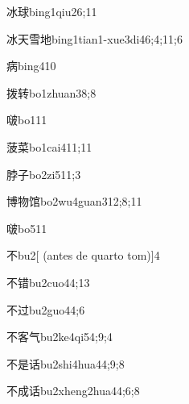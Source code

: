 \begin{verbete}{冰球}{bing1qiu2}{6;11}
\end{verbete}
\begin{verbete}{冰天雪地}{bing1tian1-xue3di4}{6;4;11;6}
\end{verbete}
\begin{verbete}{病}{bing4}{10}
\end{verbete}
\begin{verbete}{拨转}{bo1zhuan3}{8;8}
\end{verbete}
\begin{verbete}{啵}{bo1}{11}
\end{verbete}
\begin{verbete}{菠菜}{bo1cai4}{11;11}
\end{verbete}
\begin{verbete}{脖子}{bo2zi5}{11;3}
\end{verbete}
\begin{verbete}{博物馆}{bo2wu4guan3}{12;8;11}
\end{verbete}
\begin{verbete}{啵}{bo5}{11}
\end{verbete}
\begin{verbete}{不}{bu2}[ (antes de quarto tom)]{4}
\end{verbete}
\begin{verbete}{不错}{bu2cuo4}{4;13}
\end{verbete}
\begin{verbete}{不过}{bu2guo4}{4;6}
\end{verbete}
\begin{verbete}{不客气}{bu2ke4qi5}{4;9;4}
\end{verbete}
\begin{verbete}{不是话}{bu2shi4hua4}{4;9;8}
\end{verbete}
\begin{verbete}{不成话}{bu2xheng2hua4}{4;6;8}
\end{verbete}
